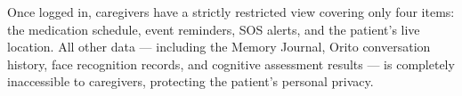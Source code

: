 Once logged in, caregivers have a strictly restricted view covering only four items: the medication schedule, event reminders, SOS alerts, and the patient's live location. All other data --- including the Memory Journal, Orito conversation history, face recognition records, and cognitive assessment results --- is completely inaccessible to caregivers, protecting the patient's personal privacy.
